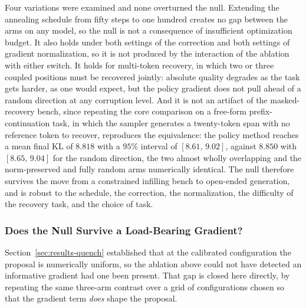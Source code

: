 Four variations were examined and none overturned the null. Extending the annealing schedule from fifty steps to one hundred creates no gap between the arms on any model, so the null is not a consequence of insufficient optimization budget.
It also holds under both settings of the correction and both settings of gradient normalization, so it is not produced by the interaction of the ablation with either switch. It holds for multi-token recovery, in which two or three coupled positions must be recovered jointly: absolute quality degrades as the task gets harder, as one would expect, but the policy gradient does not pull ahead of a random direction at any corruption level. And it is not an artifact of the masked-recovery bench, since repeating the core comparison on a free-form prefix-continuation task, in which the sampler generates a twenty-token span with no reference token to recover, reproduces the equivalence: the policy method reaches a mean final KL of $8.818$ with a $95\%$ interval of $[8.61,\, 9.02]$, against $8.850$ with $[8.65,\, 9.04]$ for the random direction, the two almost wholly overlapping and the norm-preserved and fully random arms numerically identical.
The null therefore survives the move from a constrained infilling bench to open-ended generation, and is robust to the schedule, the correction, the normalization, the difficulty of the recovery task, and the choice of task.

\subsubsection{Does the Null Survive a Load-Bearing Gradient?}
\label{sec:results-sweep}

Section~\ref{sec:results-quench} established that at the calibrated configuration the proposal is numerically uniform, so the ablation above could not have detected an informative gradient had one been present. That gap is closed here directly, by repeating the same three-arm contrast over a grid of configurations chosen so that the gradient term \emph{does} shape the proposal.

